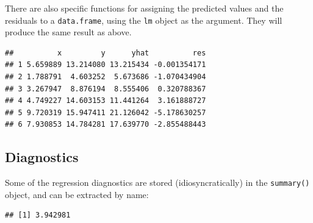 \documentclass[]{book}
\newenvironment{Shaded}{\begin{snugshade}}{\end{snugshade}}
\newcommand{\KeywordTok}[1]{\textcolor[rgb]{0.13,0.29,0.53}{\textbf{#1}}}
\newcommand{\CommentTok}[1]{\textcolor[rgb]{0.56,0.35,0.01}{\textit{#1}}}
\newcommand{\OperatorTok}[1]{\textcolor[rgb]{0.81,0.36,0.00}{\textbf{#1}}}
\newcommand{\NormalTok}[1]{#1}
\theoremstyle{definition}
\theoremstyle{definition}
\theoremstyle{definition}
\theoremstyle{remark}
\begin{document}
There are also specific functions for assigning the predicted values and
the residuals to a \texttt{data.frame}, using the \texttt{lm} object as
the argument. They will produce the same result as above.

\begin{Shaded}
\end{Shaded}

\begin{verbatim}
##          x         y      yhat          res
## 1 5.659889 13.214080 13.215434 -0.001354171
## 2 1.788791  4.603252  5.673686 -1.070434904
## 3 3.267947  8.876194  8.555406  0.320788367
## 4 4.749227 14.603153 11.441264  3.161888727
## 5 9.720319 15.947411 21.126042 -5.178630257
## 6 7.930853 14.784281 17.639770 -2.855488443
\end{verbatim}

\subsection{Diagnostics}\label{diagnostics}

Some of the regression diagnostics are stored (idiosyncratically) in the
\texttt{summary()} object, and can be extracted by name:

\begin{Shaded}
\end{Shaded}

\begin{verbatim}
## [1] 3.942981
\end{verbatim}

\begin{Shaded}
\end{Shaded}
\end{document}
